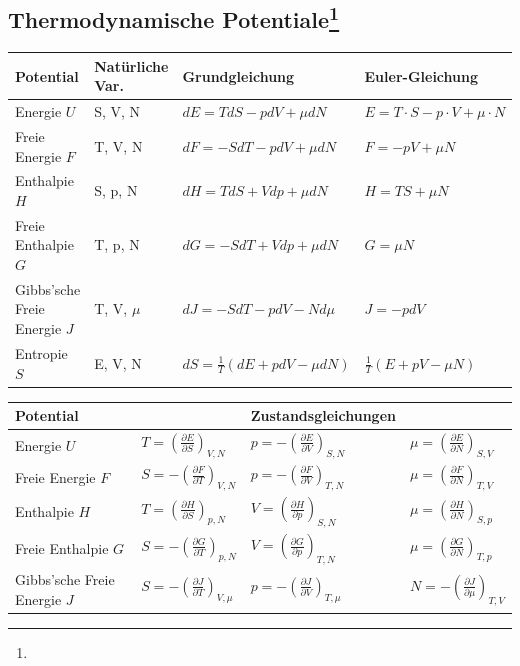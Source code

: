 \documentclass[12pt,a4paper, twoside]{article}
\newcommand{\pd}[2]{\frac{\partial #1}{\partial #2}}
\renewcommand{\=}[1]{\stackrel{#1}{=}}
\theoremstyle{definition}
\theoremstyle{remark}
\begin{document}
\subsection[Thermodynamische Potentiale]{Thermodynamische Potentiale\let\thefootnote\relax\footnote{}}

\begin{center}
\begin{framed}
\begin{tabular}{llll}
Potential & Natürliche Var. & Grundgleichung & Euler-Gleichung\\
\midrule
Energie $U$ & S, V, N & $dE = T dS - p dV + \mu dN$ & $E = T \cdot S - p \cdot V + \mu \cdot N$\\
Freie Energie $F$ & T, V, N & $dF = -S dT - p dV + \mu dN$ & $F = -pV + \mu N$\\
Enthalpie $H$ & S, p, N & $dH = T dS + V dp + \mu dN$ & $H = TS + \mu N$\\
Freie Enthalpie $G$ & T, p, N & $dG = -S dT + V dp + \mu dN$ & $G = \mu N$\\
\makecell[l]{Gibbs'sche\\ Freie Energie $J$} & T, V, $\mu$ & $dJ = -S dT - p dV - N d\mu$ & $J = -pdV$\\
Entropie $S$ & E, V, N & $dS = \frac{1}{T} (dE + p dV - \mu dN)$ & $\frac{1}{T}(E + pV - \mu N)$\\
\end{tabular}
\end{framed}
\end{center}

\begin{center}
\begin{framed}
\noindent \begin{tabular}{llll}
Potential & & Zustandsgleichungen & \\
\midrule
Energie $U$ & $T = (\pd{E}{S})_{V, N}$ & $p = - (\pd{E}{V})_{S, N}$ & $\mu = (\pd{E}{N})_{S, V}$\\
Freie Energie $F$ & $S = -(\pd{F}{T})_{V, N}$ & $p = - (\pd{F}{V})_{T, N}$ & $\mu = (\pd{F}{N})_{T, V}$\\
Enthalpie $H$ & $T = (\pd{H}{S})_{p,N}$ & $V = (\pd{H}{p})_{S,N}$ & $\mu = (\pd{H}{N})_{S,p}$\\
Freie Enthalpie $G$ & $S = -(\pd{G}{T})_{p,N}$ & $V = (\pd{G}{p})_{T,N}$ & $\mu = (\pd{G}{N})_{T,p}$\\
Gibbs'sche Freie Energie $J$ & $S = -(\pd{J}{T})_{V, \mu}$ & $p = -(\pd{J}{V})_{T,\mu}$ & $N = -(\pd{J}{\mu})_{T,V}$\\
\end{tabular}
\end{framed}
\end{center}
\end{document}
